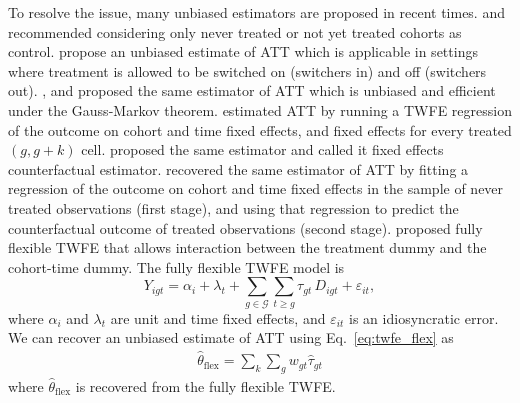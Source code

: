 \documentclass[margin=3in, 12pt]{article}
\newcommand{\1}{\mathbbm{1}}
\begin{document}
To resolve the issue, many unbiased estimators are proposed in recent times. \cite{callaway2021} and \cite{sun2021} recommended considering only never treated or not yet treated cohorts as control. \cite{dechaisemartin2020} propose an unbiased estimate of ATT which is applicable in settings where treatment is allowed to be switched on (switchers in) and off (switchers out). \cite{liu2024practical}, \cite{borusyak2024} and \cite{gardner2022two} proposed the same estimator of ATT which is unbiased and efficient under the Gauss-Markov theorem. \cite{borusyak2024} estimated ATT by running a TWFE regression of the outcome on cohort and time fixed effects, and fixed effects for every treated $(g, g+k)$ cell. \cite{liu2024practical} proposed the same estimator and called it fixed effects
counterfactual estimator. \cite{gardner2022two} recovered the same estimator of ATT by fitting a regression of the outcome on cohort and time fixed effects in the sample of never treated observations (first stage), and using that regression to predict the counterfactual outcome of treated observations (second stage). \cite{wooldridge2025} proposed fully flexible TWFE that allows interaction between the treatment dummy and the cohort-time dummy. The fully flexible TWFE model is
\begin{equation}
  Y_{igt} = \alpha_i + \lambda_t
    + \sum_{g \in \mathcal{G}} \sum_{t \geq g} \tau_{gt}\, D_{igt}
    + \varepsilon_{it},
  \label{eq:twfe_flex}
\end{equation}
where $\alpha_i$ and $\lambda_t$ are unit and time fixed effects, and
$\varepsilon_{it}$ is an idiosyncratic error. We can recover an unbiased estimate of ATT using Eq.~\ref{eq:twfe_flex} as
\begin{eqnarray}
\label{eq:theta}
	\hat\theta_{\text{flex}} = \sum_k\sum_g w_{gt}\hat\tau_{gt} 
\end{eqnarray}
where $\hat\theta_{\text{flex}}$ is recovered from the fully flexible TWFE.
\end{document}
